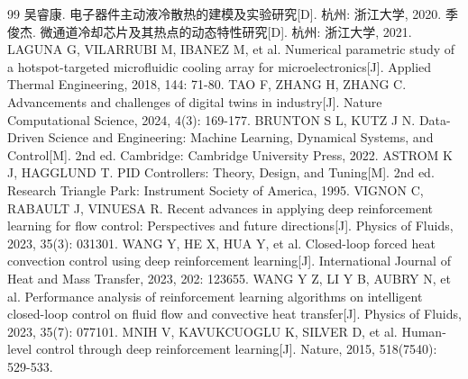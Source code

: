 \documentclass[stage1,fontset=fandol]{ydzjreport}
\begin{document}
\begin{thebibliography}{99}
	   吴睿康. 电子器件主动液冷散热的建模及实验研究[D]. 杭州: 浙江大学, 2020.
	   季俊杰. 微通道冷却芯片及其热点的动态特性研究[D]. 杭州: 浙江大学, 2021.
	   LAGUNA G, VILARRUBI M, IBANEZ M, et al. Numerical parametric study of a hotspot-targeted microfluidic cooling array for microelectronics[J]. Applied Thermal Engineering, 2018, 144: 71-80.
	   TAO F, ZHANG H, ZHANG C. Advancements and challenges of digital twins in industry[J]. Nature Computational Science, 2024, 4(3): 169-177.
	   BRUNTON S L, KUTZ J N. Data-Driven Science and Engineering: Machine Learning, Dynamical Systems, and Control[M]. 2nd ed. Cambridge: Cambridge University Press, 2022.
	   ASTROM K J, HAGGLUND T. PID Controllers: Theory, Design, and Tuning[M]. 2nd ed. Research Triangle Park: Instrument Society of America, 1995.
	   VIGNON C, RABAULT J, VINUESA R. Recent advances in applying deep reinforcement learning for flow control: Perspectives and future directions[J]. Physics of Fluids, 2023, 35(3): 031301.
	   WANG Y, HE X, HUA Y, et al. Closed-loop forced heat convection control using deep reinforcement learning[J]. International Journal of Heat and Mass Transfer, 2023, 202: 123655.
	   WANG Y Z, LI Y B, AUBRY N, et al. Performance analysis of reinforcement learning algorithms on intelligent closed-loop control on fluid flow and convective heat transfer[J]. Physics of Fluids, 2023, 35(7): 077101.
	   MNIH V, KAVUKCUOGLU K, SILVER D, et al. Human-level control through deep reinforcement learning[J]. Nature, 2015, 518(7540): 529-533.
	\end{thebibliography}
\end{document}
